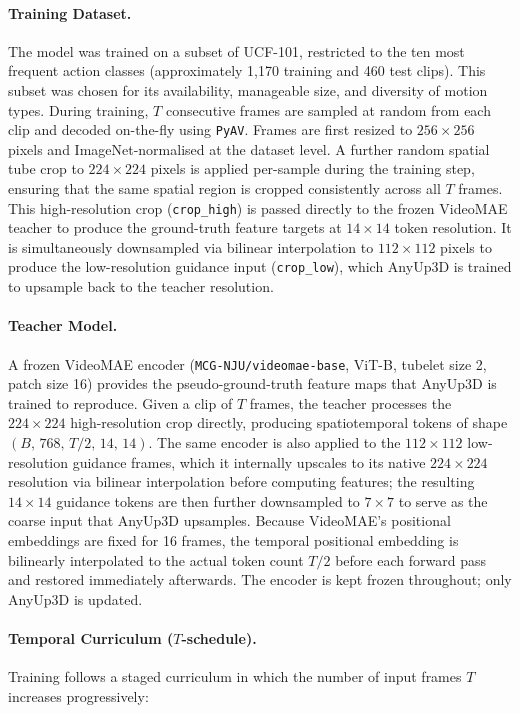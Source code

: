 \paragraph{Training Dataset.}
The model was trained on a subset of UCF-101, restricted to the ten most frequent action classes (approximately 1,170 training and 460 test clips). This subset was chosen for its availability, manageable size, and diversity of motion types. During training, $T$ consecutive frames are sampled at random from each clip and decoded on-the-fly using \texttt{PyAV}. Frames are first resized to $256 \times 256$ pixels and ImageNet-normalised at the dataset level. A further random spatial tube crop to $224 \times 224$ pixels is applied per-sample during the training step, ensuring that the same spatial region is cropped consistently across all $T$ frames. This high-resolution crop (\texttt{crop\_high}) is passed directly to the frozen VideoMAE teacher to produce the ground-truth feature targets at $14 \times 14$ token resolution. It is simultaneously downsampled via bilinear interpolation to $112 \times 112$ pixels to produce the low-resolution guidance input (\texttt{crop\_low}), which AnyUp3D is trained to upsample back to the teacher resolution.

\paragraph{Teacher Model.}
A frozen VideoMAE encoder (\texttt{MCG-NJU/videomae-base}, ViT-B, tubelet size 2, patch size 16) provides the pseudo-ground-truth feature maps that AnyUp3D is trained to reproduce. Given a clip of $T$ frames, the teacher processes the $224 \times 224$ high-resolution crop directly, producing spatiotemporal tokens of shape $(B,\,768,\,T/2,\,14,\,14)$. The same encoder is also applied to the $112 \times 112$ low-resolution guidance frames, which it internally upscales to its native $224 \times 224$ resolution via bilinear interpolation before computing features; the resulting $14 \times 14$ guidance tokens are then further downsampled to $7 \times 7$ to serve as the coarse input that AnyUp3D upsamples. Because VideoMAE's positional embeddings are fixed for 16 frames, the temporal positional embedding is bilinearly interpolated to the actual token count $T/2$ before each forward pass and restored immediately afterwards. The encoder is kept frozen throughout; only AnyUp3D is updated.

\paragraph{Temporal Curriculum ($T$-schedule).}
Training follows a staged curriculum in which the number of input frames $T$ increases progressively:

